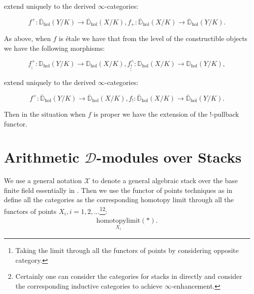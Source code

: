 \documentclass[11pt]{book}
\theoremstyle{definition}
\numberwithin{equation}{section}
\begin{document}
extend uniquely to the derived $\infty$-categories:

\begin{displaymath}
f^+: \overline{\mathbb{D}}_\mathrm{hol}(Y/K)\rightarrow \overline{\mathbb{D}}_\mathrm{hol}(X/K),f_+: \overline{\mathbb{D}}_\mathrm{hol}(X/K)\rightarrow \overline{\mathbb{D}}_\mathrm{hol}(Y/K).	
\end{displaymath}


\indent As above, when $f$ is \'etale we have that from the level of the constructible objects we have the following morphisms:


\begin{displaymath}
\underline{\underline{f^+}}: \mathbb{D}_\mathrm{hol}(Y/K)\rightarrow \mathbb{D}_\mathrm{hol}(X/K),\underline{\underline{f^\wedge_!}}: \mathbb{D}_\mathrm{hol}(X/K)\rightarrow \mathbb{D}_\mathrm{hol}(Y/K),	
\end{displaymath}

extend uniquely to the derived $\infty$-categories:

\begin{displaymath}
f^+: \overline{\mathbb{D}}_\mathrm{hol}(Y/K)\rightarrow \overline{\mathbb{D}}_\mathrm{hol}(X/K),f_!: \overline{\mathbb{D}}_\mathrm{hol}(X/K)\rightarrow \overline{\mathbb{D}}_\mathrm{hol}(Y/K).	
\end{displaymath}

\indent Then in the situation when $f$ is proper we have the extension of the $!$-pullback functor.


\newpage
\section{Arithmetic $\mathcal{D}$-modules over Stacks}


\indent We use a general notation $\mathcal{X}$ to denote a general algebraic stack over the base finite field essentially in \cite[Construction 3.2.5.1]{GL1}. Then we use the functor of points techniques as in \cite[Construction 3.2.5.1]{GL1} define all the categories as the corresponding homotopy limit through all the functors of points $X_i,i=1,2,...$\footnote{Taking the limit through all the functors of points by considering opposite category.}\footnote{Certainly one can consider the categories for stacks in \cite{Abe} directly and consider the corresponding inductive categories to achieve $\infty$-enhancement.}:
\begin{align}
\underset{X_i}{\mathrm{homotopylimit}}(*).	
\end{align}
\end{document}
